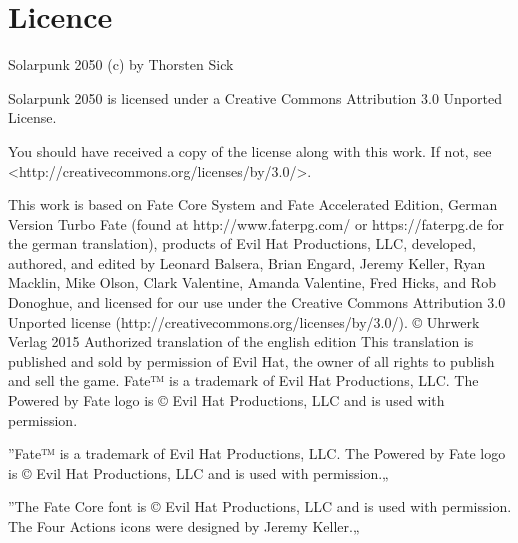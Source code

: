 \section{Licence}


Solarpunk 2050 (c) by Thorsten Sick

Solarpunk 2050 is licensed under a
Creative Commons Attribution 3.0 Unported License.

You should have received a copy of the license along with this
work.  If not, see <http://creativecommons.org/licenses/by/3.0/>.

This work is based on Fate Core System and Fate Accelerated Edition, German Version Turbo Fate (found at http://www.faterpg.com/ or https://faterpg.de for the german translation), products of Evil Hat Productions, LLC, developed, authored, and edited by Leonard Balsera, Brian Engard, Jeremy Keller, Ryan Macklin, Mike Olson, Clark Valentine, Amanda Valentine, Fred Hicks, and Rob Donoghue, and licensed for our use under the Creative Commons Attribution 3.0 Unported license (http://creativecommons.org/licenses/by/3.0/).
© Uhrwerk Verlag 2015 Authorized translation of the english edition
This translation is published and sold by permission of Evil Hat, the owner of all rights to publish and sell the game.
Fate™ is a trademark of Evil Hat Productions, LLC. The Powered by Fate logo is © Evil Hat Productions, LLC and is used with permission.

”Fate™ is a trademark of Evil Hat Productions, LLC. The Powered by Fate logo is © Evil Hat Productions, LLC and is used with permission.„

”The Fate Core font is © Evil Hat Productions, LLC and is used with permission. The Four Actions icons were designed by Jeremy Keller.„